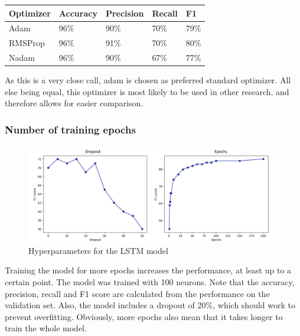 \documentclass[
a4paper,
pagesize,
pdftex,
12pt,
twoside, %
BCOR=5mm, %
ngerman,
fleqn,
final,
]{scrartcl}
\begin{document}
	\begin{tabular}{ | p{3cm} || p{2cm}|p{2cm}|p{2cm}|p{2cm}|  }
		\hline
		\textbf{Optimizer} & \textbf{Accuracy} & \textbf{Precision} & \textbf{Recall} & \textbf{F1} \\
		\hline
		Adam & 96\%& 90\%& 70\%& 79\% \\
		RMSProp & 96\% &  91\% &  70\% &  80\% \\ 
		Nadam & 96\% & 90\% & 67\% & 77\%\\
		\hline
		\hline
	\end{tabular}
	
	As this is a very close call, adam is chosen as preferred standard optimizer. All else being equal, this optimizer is most likely to be used in other research, and therefore allows for easier comparison.
	
	\subsubsection{Number of training epochs}
			\begin{figure}[h]
		\centering
		\includegraphics[width=1\textwidth]{img/hyper2}
		\caption{Hyperparameters for the LSTM model}
		\label{fig:hyper2}
	\end{figure}
	
	Training the model for more epochs increases the performance, at least up to a certain point. The model was trained with 100 neurons. Note that the accuracy, precision, recall and F1 score are calculated from the performance on the validation set. Also, the model includes a dropout of 20\%, which should work to prevent overfitting. Obviously, more epochs also mean that it takes longer to train the whole model.
	
\end{document}

